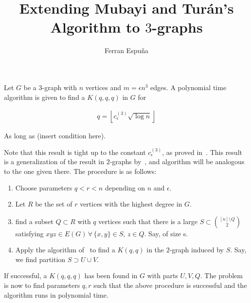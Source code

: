 \documentclass[12pt]{article}
\author{Ferran Espuña}
\date{} %
\begin{document}
    \title{Extending Mubayi and Turán's Algorithm to $3$-graphs}

    \maketitle

    Let $G$ be a $3$-graph with $n$ vertices and $m = \epsilon n^3$ edges.
    A polynomial time algorithm is given to find a $K(q, q, q)$ in $G$ for

    \begin{align*}
        q = \left \lfloor c^{(3)}_{\epsilon} \sqrt {\log n} \right \rfloor
        \label{eq:q}
    \end{align*}

    As long as (insert condition here). %
    
    Note that this result is tight up to the constant $c^{(3)}_{\epsilon}$,
    as proved in~\cite{Erods1964}.
    This result is a generalization of the result in $2$-graphs by~\cite{MUBAYI2010174},
    and algorithm will be analogous to the one given there.
    The procedure is as follows:

    \begin{enumerate}
        \item Choose parameters $q < r < n$ depending on $n$ and $\epsilon$.
        \item Let $R$ be the set of $r$ vertices with the highest degree in $G$.
        \item find a subset $Q \subset R$ with $q$ vertices such that there is a large
        $S \subset \binom{[n] \setminus Q}{2}$ satisfying
        $xyz \in E(G) \, \forall \, \{x, y\} \in S, \, z \in Q$.
        Say, of size s.
        \item Apply the algorithm of~\cite{MUBAYI2010174} to find a $K(q, q)$ in the
        $2$-graph induced by $S$.
        Say, we find partition $S \supset U \cup V$.
    \end{enumerate}

    If successful, a $K(q, q, q)$ has been found in $G$ with parts $U, V, Q$.
    The problem is now to find parameters $q, r$ such that the above procedure is successful
    and the algorithm runs in polynomial time.
\end{document}
